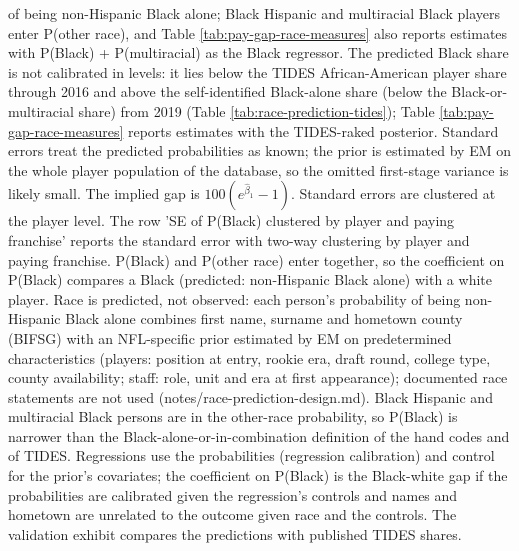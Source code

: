 {of being non-Hispanic Black alone; Black Hispanic and multiracial Black players enter P(other race), and Table \ref{tab:pay-gap-race-measures} also reports estimates with P(Black) + P(multiracial) as the Black regressor. The predicted Black share is not calibrated in levels: it lies below the TIDES African-American player share through 2016 and above the self-identified Black-alone share (below the Black-or-multiracial share) from 2019 (Table \ref{tab:race-prediction-tides}); Table \ref{tab:pay-gap-race-measures} reports estimates with the TIDES-raked posterior. Standard errors treat the predicted probabilities as known; the prior is estimated by EM on the whole player population of the database, so the omitted first-stage variance is likely small. The implied gap is $100(e^{\hat\beta_1}-1)$. Standard errors are clustered at the player level. The row 'SE of P(Black) clustered by player and paying franchise' reports the standard error with two-way clustering by player and paying franchise. P(Black) and P(other race) enter together, so the coefficient on P(Black) compares a Black (predicted: non-Hispanic Black alone) with a white player. Race is predicted, not observed: each person's probability of being non-Hispanic Black alone combines first name, surname and hometown county (BIFSG) with an NFL-specific prior estimated by EM on predetermined characteristics (players: position at entry, rookie era, draft round, college type, county availability; staff: role, unit and era at first appearance); documented race statements are not used (notes/race-prediction-design.md). Black Hispanic and multiracial Black persons are in the other-race probability, so P(Black) is narrower than the Black-alone-or-in-combination definition of the hand codes and of TIDES. Regressions use the probabilities (regression calibration) and control for the prior's covariates; the coefficient on P(Black) is the Black-white gap if the probabilities are calibrated given the regression's controls and names and hometown are unrelated to the outcome given race and the controls. The validation exhibit compares the predictions with published TIDES shares.
\par}

